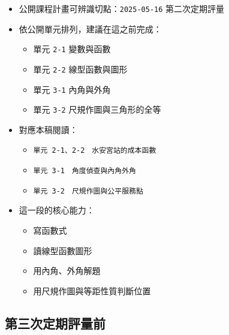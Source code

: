 \documentclass[
  chinese,
  12pt,
  a4paper,
  oneside]{article}
\providecommand{\tightlist}{%
  \setlength{\itemsep}{0pt}\setlength{\parskip}{0pt}}
\begin{document}
\begin{itemize}
\tightlist
\item
  公開課程計畫可辨識切點：\texttt{2025-05-16} 第二次定期評量
\item
  依公開單元排列，建議在這之前完成：

  \begin{itemize}
  \tightlist
  \item
    單元 \texttt{2-1} 變數與函數
  \item
    單元 \texttt{2-2} 線型函數與圖形
  \item
    單元 \texttt{3-1} 內角與外角
  \item
    單元 \texttt{3-2} 尺規作圖與三角形的全等
  \end{itemize}
\item
  對應本稿閱讀：

  \begin{itemize}
  \tightlist
  \item
    \texttt{單元\ 2-1、2-2　水安宮站的成本函數}
  \item
    \texttt{單元\ 3-1　角度偵查與內角外角}
  \item
    \texttt{單元\ 3-2　尺規作圖與公平服務點}
  \end{itemize}
\item
  這一段的核心能力：

  \begin{itemize}
  \tightlist
  \item
    寫函數式
  \item
    讀線型函數圖形
  \item
    用內角、外角解題
  \item
    用尺規作圖與等距性質判斷位置
  \end{itemize}
\end{itemize}

\subsection{第三次定期評量前}\label{ux7b2cux4e09ux6b21ux5b9aux671fux8a55ux91cfux524d}
\end{document}
